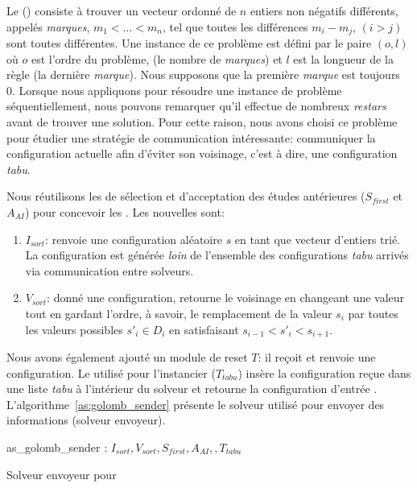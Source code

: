 \documentclass{jfpc-preprint}
\begin{document}
Le \grp{} (\GRP) consiste à trouver un vecteur ordonné de $n$ entiers non négatifs différents, appelés \textit{marques}, $m_1<\dots<m_n$, tel que toutes les différences $m_i- m_j$, $(i>j)$ sont toutes différentes. Une instance de ce problème est défini par le paire $(o,l)$ où $o$ est l'ordre du problème, (le nombre de \textit{marques}) et  $l$ est la longueur de la règle (la dernière {\it marque}). Nous supposons que la première \textit{marque} est toujours 0. Lorsque nous appliquons \posl{} pour résoudre une instance de problème séquentiellement, nous pouvons remarquer qu'il effectue de nombreux {\it restars} avant de trouver une solution. Pour cette raison, nous avons choisi ce problème pour étudier une stratégie de communication intéressante: communiquer la configuration actuelle afin d'éviter son voisinage, c'est à dire, une configuration {\it tabu}.

Nous réutilisons les \ms{} de sélection et d'acceptation des études antérieures ($S_{first}$ et$A_{AI}$) pour concevoir les \ass. Les nouvelles \ms{} sont:
\begin{enumerate}
\item $I_{sort}$: renvoie une configuration aléatoire $s$ en tant que vecteur d'entiers trié. La configuration est générée \textit{loin} de l'ensemble des configurations {\it tabu} arrivés via communication entre solveurs.
\item $V_{sort}$: donné une configuration, retourne le voisinage en changeant une valeur tout en gardant l'ordre, à savoir, le remplacement de la valeur $s_i$ par toutes les valeurs possibles $s'_i \in D_i$ en satisfaisant $s_{i-1}< s'_i < s_{i+1}$.
\end{enumerate}

Nous avons également ajouté un module de reset $T$: il reçoit et renvoie une configuration. Le \om{} utilisé pour l'instancier ($T_{tabu}$) insère la configuration reçue dans une liste \textit{tabu} à l'intérieur du solveur et retourne la configuration d'entrée . L'algorithme~\ref{as:golomb_sender} présente le solveur utilisé pour envoyer des informations (solveur envoyeur).

\begin{algorithm}
\dontprintsemicolon
\scriptsize
\SetNoline
{}
   as\_golomb\_sender\;
\algoindent{} : $I_{sort}, V_{sort}, S_{first}, A_{AI}, , T_{tabu}$ \; 
\caption{Solveur envoyeur pour  \GRP}\label{as:golomb_sender}
\end{algorithm}
\end{document}
